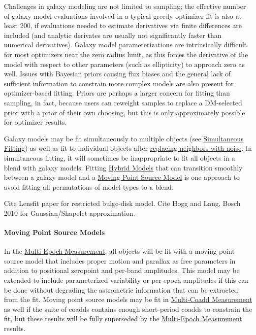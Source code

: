 Challenges in galaxy modeling are not limited to sampling; the effective number of galaxy model evaluations involved in a typical greedy optimizer fit is also at least 200, if evaluations needed to estimate derivatives via finite differences are included (and analytic derivates are usually not significantly faster than numerical derivatives).  Galaxy model parameterizations are intrinsically difficult for most optimizers near the zero radius limit, as this forces the derivative of the model with respect to other parameters (such as ellipticity) to approach zero as well.  Issues with Bayesian priors causing flux biases and the general lack of sufficient information to constrain more complex models are also present for optimizer-based fitting.  Priors are perhaps a larger concern for fitting than sampling, in fact, because users can reweight samples to replace a DM-selected prior with a prior of their own choosing, but this is only approximately possible for optimizer results.

Galaxy models may be fit simultaneously to multiple objects (see \hyperref[sec:acSimultaneousFitting]{Simultaneous Fitting}) as well as fit to individual objects after \hyperref[sec:acReplaceNeighborsWithNoise]{replacing neighbors with noise}.  In simultaneous fitting, it will sometimes be inappropriate to fit all objects in a blend with galaxy models.  Fitting \hyperref[sec:acHybridModels]{Hybrid Models} that can transition smoothly between a galaxy model and a \hyperref[sec:acMovingPointSourceModels]{Moving Point Source Model} is one approach to avoid fitting all permutations of model types to a blend.

\begin{note}[TODO]
Cite Lensfit paper for restricted bulge-disk model.  Cite Hogg and Lang, Bosch 2010 for Gaussian/Shapelet approximation.
\end{note}

\paragraph{Moving Point Source Models}
\label{sec:acMovingPointSourceModels}

In the \hyperref[sec:acMultiEpochMeasurement]{Multi-Epoch Measurement}, all objects will be fit with a moving point source model that includes proper motion and parallax as free parameters in addition to positional zeropoint and per-band amplitudes.  This model may be extended to include parameterized variability or per-epoch amplitudes if this can be done without degrading the astrometric information that can be extracted from the fit.  Moving point source models may be fit in \hyperref[sec:acMultiCoaddMeasurement]{Multi-Coadd Measurement} as well if the suite of coadds contains enough short-period coadds to constrain the fit, but these results will be fully superseded by the \hyperref[sec:acMultiEpochMeasurement]{Multi-Epoch Measurement} results.

